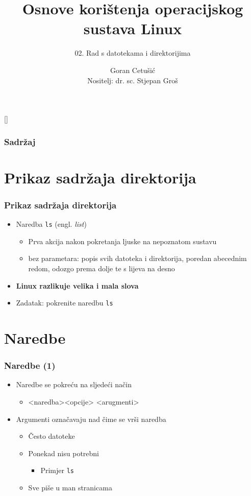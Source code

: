 \documentclass{beamer}
\title{Osnove korištenja operacijskog sustava Linux}
\subtitle{02. Rad s datotekama i direktorijima}
\author[Goran Cetušić]{Goran Cetušić\\{\small Nositelj: dr. sc. Stjepan Groš}}
\institute[FER]{Sveučilište u Zagrebu \\
				Fakultet elektrotehnike i računarstva}
\date{\todayiso}
\begin{document}
[]

\begin{frame}
\maketitle
\end{frame}

\begin{frame}
\frametitle{Sadržaj}
\tableofcontents
\end{frame}

\section{Prikaz sadržaja direktorija}
\begin{frame}[t]
\frametitle{Prikaz sadržaja direktorija}
\begin{itemize}
  \item Naredba \texttt {ls} (engl. \emph{list})
  \begin{itemize}
    \item Prva akcija nakon pokretanja ljuske na nepoznatom sustavu
    \item bez parametara: popis svih datoteka i direktorija, poredan
          abecednim redom, odozgo prema dolje te s lijeva na desno
  \end{itemize}
  \item \textbf {Linux razlikuje velika i mala slova}
  \item Zadatak: pokrenite naredbu \texttt{ls}
\end{itemize}
\end{frame}

\section{Naredbe}
\begin{frame}[t]
\frametitle{Naredbe (1)}
\begin{itemize}
  \item Naredbe se pokreću na sljedeći način
  \begin{itemize}
    \item[] \textless naredba\textgreater \textless opcije\textgreater 
          \textless arugmenti\textgreater
  \end{itemize}
  \item Argumenti označavaju nad čime se vrši naredba
  \begin{itemize}
    \item Često datoteke
    \item Ponekad nisu potrebni
    \begin{itemize}
      \item Primjer \texttt{ls}
    \end{itemize}
    \item Sve piše u man stranicama
  \end{itemize}
\end{itemize}
\end{frame}
\end{document}
